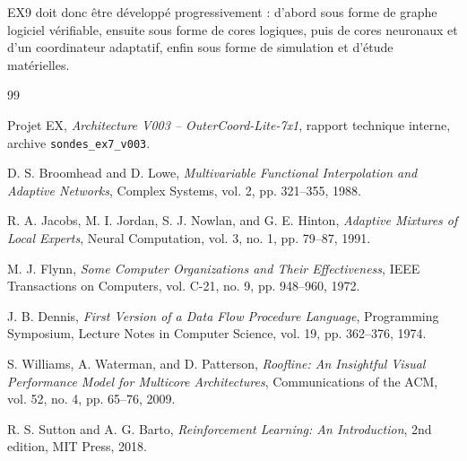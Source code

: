 \documentclass[11pt,a4paper]{article}
\begin{document}
EX9 doit donc être développé progressivement : d'abord sous forme
de graphe logiciel vérifiable, ensuite sous forme de cores logiques,
puis de cores neuronaux et d'un coordinateur adaptatif, enfin sous
forme de simulation et d'étude matérielles.

\begin{thebibliography}{99}

Projet EX,
\textit{Architecture V003 -- OuterCoord-Lite-7x1},
rapport technique interne, archive
\texttt{sondes\_ex7\_v003}.

D. S. Broomhead and D. Lowe,
\textit{Multivariable Functional Interpolation and Adaptive Networks},
Complex Systems, vol. 2, pp. 321--355, 1988.

R. A. Jacobs, M. I. Jordan, S. J. Nowlan, and G. E. Hinton,
\textit{Adaptive Mixtures of Local Experts},
Neural Computation, vol. 3, no. 1, pp. 79--87, 1991.

M. J. Flynn,
\textit{Some Computer Organizations and Their Effectiveness},
IEEE Transactions on Computers, vol. C-21, no. 9,
pp. 948--960, 1972.

J. B. Dennis,
\textit{First Version of a Data Flow Procedure Language},
Programming Symposium, Lecture Notes in Computer Science,
vol. 19, pp. 362--376, 1974.

S. Williams, A. Waterman, and D. Patterson,
\textit{Roofline: An Insightful Visual Performance Model for
Multicore Architectures},
Communications of the ACM, vol. 52, no. 4, pp. 65--76, 2009.

R. S. Sutton and A. G. Barto,
\textit{Reinforcement Learning: An Introduction},
2nd edition, MIT Press, 2018.

\end{thebibliography}
\end{document}
